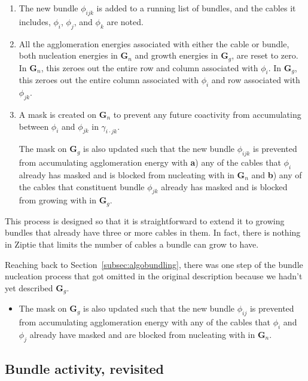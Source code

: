\begin{enumerate}
\item{The new bundle $\phi_{ijk}$ is added to a running list of bundles,
  and the cables it includes, $\phi_i$, $\phi_j$, and $\phi_k$ are noted.}
\item{All the agglomeration energies associated with either the
  cable or bundle, both nucleation energies in
  $\mathbf{G}_n$ and growth energies in $\mathbf{G}_g$, are
  reset to zero. In $\mathbf{G}_n$,
  this zeroes out the entire row and column associated with $\phi_{i}$.
  In $\mathbf{G}_g$,
  this zeroes out the entire column associated with $\phi_{i}$ and row
  associated with $\phi_{jk}$.
}
\item{
  A mask is created on $\mathbf{G}_n$ to prevent any future coactivity from
  accumulating between $\phi_i$ and $\phi_{jk}$ in
  $\gamma_{i \cdot jk}$.

  The mask on $\mathbf{G}_g$ is also updated such that the new bundle
  $\phi_{ijk}$ is prevented from accumulating agglomeration energy with
  \textbf{a}) any of the cables that $\phi_i$ already has masked and is blocked
  from nucleating with in $\mathbf{G}_n$
  and \textbf{b}) any of the cables that constituent bundle $\phi_{jk}$
  already has masked and is blocked from growing with in $\mathbf{G}_g$.
}
\end{enumerate}

This process is designed so that it is straightforward to
extend it to growing bundles that already
have three or more cables in them. In fact, there is nothing in Ziptie
that limits the number of cables a bundle can grow to have.

Reaching back to Section~\ref{subsec:algobundling}, there was one step of the
bundle nucleation process that got
omitted in the original description because we hadn't yet described
$\mathbf{G}_g$.

\begin{itemize}
\item{
  The mask on $\mathbf{G}_g$ is also updated such that the new bundle
  $\phi_{ij}$ is prevented from accumulating agglomeration energy with
  any of the cables that $\phi_i$ and $\phi_j$ already have masked
  and are blocked from nucleating with in $\mathbf{G}_n$.
}
\end{itemize}

\subsection{Bundle activity, revisited}
\label{subsec:algobundleactivityrevisited}

